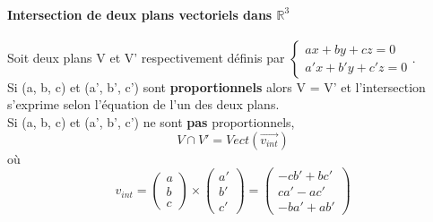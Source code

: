 \documentclass[10pt,a4paper]{book}
\newcommand{\R}{\mathbb{R}}
\begin{document}
\paragraph{Intersection de deux plans vectoriels dans $\R^3$}
Soit deux plans V et V' respectivement définis par \(\left\lbrace \begin{array}{rcl}
ax + by + cz = 0 \\
a'x + b'y + c'z = 0
\end{array} \right.\). \\
Si (a, b, c) et (a', b', c') sont \textbf{proportionnels} alors V = V' et l'intersection s'exprime selon l'équation de l'un des deux plans. \\
Si (a, b, c) et (a', b', c') ne sont \textbf{pas} proportionnels, 
\[V\cap V' = Vect(\vec{v_{int}})\]
où
\[v_{int} = \begin{pmatrix} a \\ b \\ c \end{pmatrix} \times \begin{pmatrix} a' \\ b' \\ c' \end{pmatrix} = \begin{pmatrix} -cb' + bc' \\ ca' - ac' \\ -ba' + ab'\end{pmatrix}\]

\end{document}
